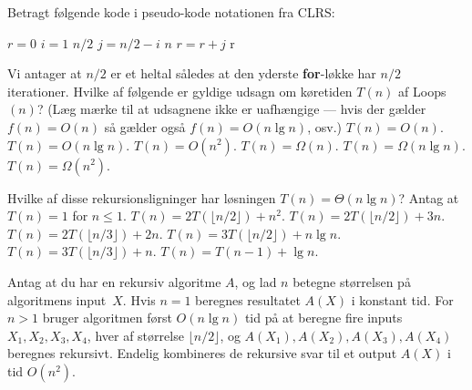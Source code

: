 Betragt følgende kode i pseudo-kode notationen fra CLRS:
\begin{codebox}
 \li $r = 0$
 \li \For $i = 1$ \To $n/2$
 \li \Do \For $j = n/2-i$ \To $n$
 \li \Do $r = r + j$ \End \End \End
 \li \Return r
\end{codebox}
Vi antager at $n/2$ er et heltal således at den yderste {\bf for}-løkke har $n/2$ iterationer.
Hvilke af følgende er gyldige udsagn om køretiden $T(n)$ af {\sc Loops}$(n)$?
(Læg mærke til at udsagnene ikke er uafhængige --- hvis der gælder $f(n) = O(n)$ så gælder også $f(n) = O(n \lg n)$, osv.)
\fleresvar
\mulighederstart
\svar $T(n) = O(n)$.
\svar $T(n) = O(n \lg n)$.
\svar $T(n) = O(n^2)$. \korrekt
\svar $T(n) = \Omega(n)$. \korrekt
\svar $T(n) = \Omega(n \lg n)$. \korrekt
\svar $T(n) = \Omega(n^2)$. \korrekt
\mulighederslut




Hvilke af disse rekursionsligninger har løsningen
$T(n) = \Theta(n \lg n)$? Antag at $T(n)=1$ for $n\leq 1$.
\fleresvar
\mulighederstart
\svar $T(n) = 2 T(\lfloor n/2\rfloor ) + n^2$.
\svar $T(n) = 2 T(\lfloor n/2\rfloor ) + 3n$. \korrekt
\svar $T(n) = 2 T(\lfloor n/3\rfloor ) + 2n$.
\svar $T(n) = 3 T(\lfloor n/2\rfloor ) + n \lg n$.
\svar $T(n) = 3 T(\lfloor n/3\rfloor ) + n$. \korrekt
\svar $T(n) = T(n-1) + \lg n$. \korrekt %
\mulighederslut
{}



Antag at du har en rekursiv algoritme $A$, og lad $n$ betegne størrelsen på algoritmens input~$X$.
Hvis $n=1$ beregnes resultatet $A(X)$ i konstant tid.
For $n>1$ bruger algoritmen først $O(n \lg n)$ tid på at beregne fire inputs $X_1, X_2, X_3, X_4$, hver af størrelse $\lfloor n/2\rfloor$, og $A(X_1), A(X_2), A(X_3), A(X_4)$ beregnes rekursivt.
Endelig kombineres de rekursive svar til et output $A(X)$ i tid $O(n^2)$.


